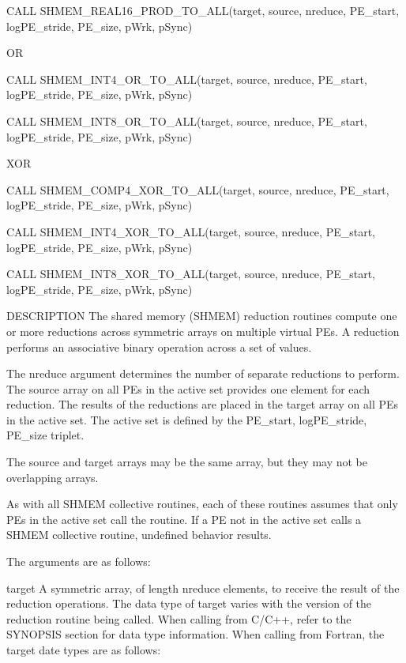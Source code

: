 	  CALL	SHMEM_REAL16_PROD_TO_ALL(target,  source,  nreduce,  PE_start,
	  logPE_stride, PE_size, pWrk, pSync)

           OR
 
	  CALL	 SHMEM_INT4_OR_TO_ALL(target,	source,	  nreduce,   PE_start,
	  logPE_stride, PE_size, pWrk, pSync)

	  CALL	 SHMEM_INT8_OR_TO_ALL(target,	source,	  nreduce,   PE_start,
	  logPE_stride, PE_size, pWrk, pSync)	
	  
	  XOR
	  
	  CALL	 SHMEM_COMP4_XOR_TO_ALL(target,	  source,  nreduce,  PE_start,
	  logPE_stride, PE_size, pWrk, pSync)

	  CALL	SHMEM_INT4_XOR_TO_ALL(target,	source,	  nreduce,   PE_start,
	  logPE_stride, PE_size, pWrk, pSync)

	  CALL	 SHMEM_INT8_XOR_TO_ALL(target,	 source,   nreduce,  PE_start,
	  logPE_stride, PE_size, pWrk, pSync)
	    

DESCRIPTION
       The  shared  memory  (SHMEM)  reduction	routines  compute  one or more
       reductions  across  symmetric  arrays  on  multiple  virtual  PEs.    A
       reduction  performs  an	associative  binary  operation across a set of
       values.	 

       The  nreduce  argument  determines the number of separate reductions to
       perform.	 The source array on all PEs in the active  set	 provides  one
       element	for  each reduction.  The results of the reductions are placed
       in the target array on all PEs in the active set.  The  active  set  is
       defined by the PE_start, logPE_stride, PE_size triplet.

       The source and target arrays may be the same array, but they may not be
       overlapping arrays.

       As with all SHMEM collective routines, each of these  routines  assumes
       that  only  PEs in the active set call the routine.  If a PE not in the
       active  set  calls  a  SHMEM  collective	 routine,  undefined  behavior
       results.

       The arguments are as follows:

       target	    A  symmetric array, of length nreduce elements, to receive
		    the result of the reduction operations.  The data type  of
		    target  varies  with  the version of the reduction routine
		    being called.  When	 calling  from	C/C++,	refer  to  the
		    SYNOPSIS  section for data type information.  When calling
		    from Fortran, the target date types are as follows:

